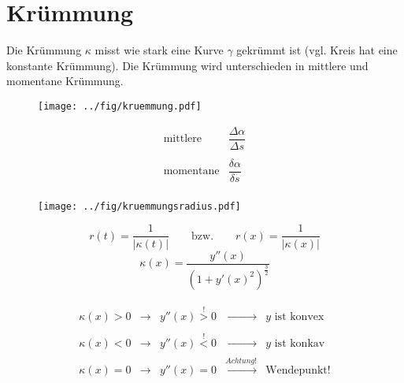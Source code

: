 




\section{Krümmung}

Die Krümmung $\kappa$ misst wie stark eine Kurve $\gamma$ gekrümmt ist (vgl. 
Kreis hat eine konstante Krümmung).
Die Krümmung wird unterschieden in mittlere und momentane Krümmung.
\begin{figure}[h!]
\centering
\texttt{[image: ../fig/kruemmung.pdf]}
\end{figure}

\[ \begin{array}{ll}
	\text{mittlere}  & \dfrac{\Delta \alpha}{\Delta s} \\
	& \\
	\text{momentane} & \dfrac{\delta \alpha}{\delta s} \\
\end{array} \]

\begin{figure}[h!]
\centering
\texttt{[image: ../fig/kruemmungsradius.pdf]}
\end{figure}
\[ \boxed{r(t) = \dfrac{1}{|\kappa(t)|} \quad \quad \text{bzw.} 
\quad \quad r(x) = \dfrac{1}{|\kappa(x)|} } \]
\[ \boxed{\kappa(x) = \frac{y''(x)}{(1 + y'(x)^2)^{\frac{3}{2}}} }\]

\[\boxed{\begin{array}{lllll} 
	\kappa (x) > 0 & \rightarrow & y''(x) \stackrel{!}{>} 0 
    & \xrightarrow[]{\phantom{Achtung!}} & y \text{ ist konvex} \\
	\kappa (x) < 0 & \rightarrow & y''(x) \stackrel{!}{<} 0 
    & \xrightarrow[]{\phantom{Achtung!}} & y \text{ ist konkav} \\
	\kappa (x) = 0 & \rightarrow & y''(x) = 0		
    & \xrightarrow[]{Achtung!} & \text{Wendepunkt!}
\end{array}}\]
